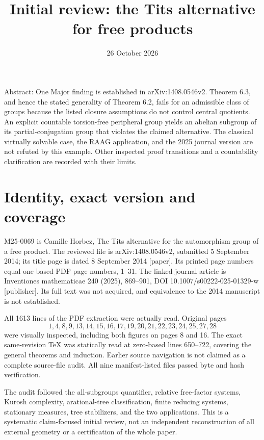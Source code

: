 \documentclass[10pt]{article}
\title{Initial review: the Tits alternative for free products}
\author{}
\date{26 October 2026}
\begin{document}
\maketitle
Abstract: One Major finding is established in arXiv:1408.0546v2. Theorem 6.3, and hence the stated generality of Theorem 6.2, fails for an admissible class of groups because the listed closure assumptions do not control central quotients. An explicit countable torsion-free peripheral group yields an abelian subgroup of its partial-conjugation group that violates the claimed alternative. The classical virtually solvable case, the RAAG application, and the 2025 journal version are not refuted by this example. Other inspected proof transitions and a countability clarification are recorded with their limits.\par
\section*{Identity, exact version and coverage}
M25-0069 is Camille Horbez, The Tits alternative for the automorphism group of a free product. The reviewed file is arXiv:1408.0546v2, submitted 5 September 2014; its title page is dated 8 September 2014 [paper]. Its printed page numbers equal one-based PDF page numbers, 1–31. The linked journal article is Inventiones mathematicae 240 (2025), 869–901, DOI 10.1007/s00222-025-01329-w [publisher]. Its full text was not acquired, and equivalence to the 2014 manuscript is not established.\par
All 1613 lines of the PDF extraction were actually read. Original pages \[1,4,8,9,13,14,15,16,17,19,20,21,22,23,24,25,27,28\] were visually inspected, including both figures on pages 8 and 16. The exact same-revision TeX was statically read at zero-based lines 650–722, covering the general theorems and induction. Earlier source navigation is not claimed as a complete source-file audit. All nine manifest-listed files passed byte and hash verification.\par
The audit followed the all-subgroups quantifier, relative free-factor systems, Kurosh complexity, arational-tree classification, finite reducing systems, stationary measures, tree stabilizers, and the two applications. This is a systematic claim-focused initial review, not an independent reconstruction of all external geometry or a certification of the whole paper.\par
\end{document}
